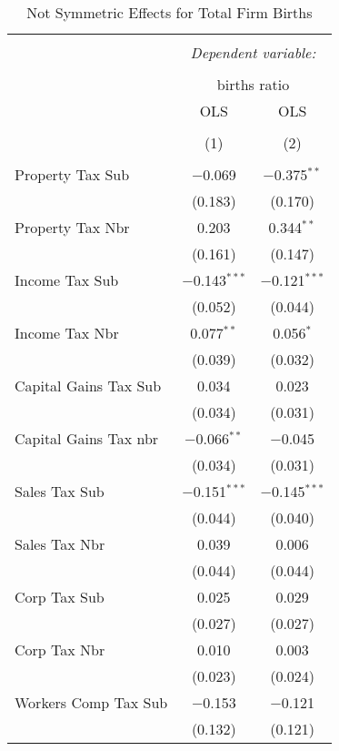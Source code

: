 
\begin{table}[!htbp] \centering 
  \caption{Not Symmetric Effects for  Total Firm Births} 
  \label{} 
\begin{tabular}{@{\extracolsep{5pt}}lcc} 
\\[-1.8ex]\hline 
\hline \\[-1.8ex] 
 & \multicolumn{2}{c}{\textit{Dependent variable:}} \\ 
\cline{2-3} 
\\[-1.8ex] & \multicolumn{2}{c}{births ratio} \\ 
 & OLS & OLS \\ 
\\[-1.8ex] & (1) & (2)\\ 
\hline \\[-1.8ex] 
 Property Tax Sub & $-$0.069 & $-$0.375$^{**}$ \\ 
  & (0.183) & (0.170) \\ 
  Property Tax Nbr & 0.203 & 0.344$^{**}$ \\ 
  & (0.161) & (0.147) \\ 
  Income Tax Sub & $-$0.143$^{***}$ & $-$0.121$^{***}$ \\ 
  & (0.052) & (0.044) \\ 
  Income Tax Nbr & 0.077$^{**}$ & 0.056$^{*}$ \\ 
  & (0.039) & (0.032) \\ 
  Capital Gains Tax Sub & 0.034 & 0.023 \\ 
  & (0.034) & (0.031) \\ 
  Capital Gains Tax nbr & $-$0.066$^{**}$ & $-$0.045 \\ 
  & (0.034) & (0.031) \\ 
  Sales Tax Sub & $-$0.151$^{***}$ & $-$0.145$^{***}$ \\ 
  & (0.044) & (0.040) \\ 
  Sales Tax Nbr & 0.039 & 0.006 \\ 
  & (0.044) & (0.044) \\ 
  Corp Tax Sub & 0.025 & 0.029 \\ 
  & (0.027) & (0.027) \\ 
  Corp Tax Nbr & 0.010 & 0.003 \\ 
  & (0.023) & (0.024) \\ 
  Workers Comp Tax Sub & $-$0.153 & $-$0.121 \\ 
  & (0.132) & (0.121) \\ 

\end{tabular}
\end{table}
